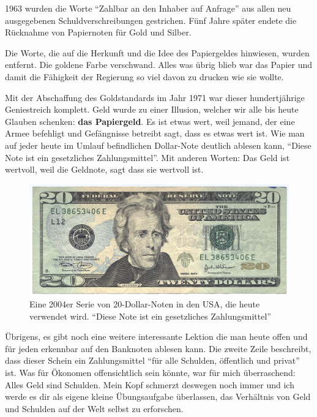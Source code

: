 1963 wurden die Worte \enquote{Zahlbar an den Inhaber auf Anfrage} aus allen neu
ausgegebenen Schuldverschreibungen gestrichen. Fünf Jahre später endete die
Rücknahme von Papiernoten für Gold und Silber.

Die Worte, die auf die Herkunft und die Idee des Papiergeldes hinwiesen, wurden
entfernt. Die goldene Farbe verschwand. Alles was übrig blieb war das Papier und
damit die Fähigkeit der Regierung so viel davon zu drucken wie sie wollte.

Mit der Abschaffung des Goldstandards im Jahr 1971 war dieser hundertjährige
Geniestreich komplett. Geld wurde zu einer Illusion, welcher wir alle bis heute
Glauben schenken: \textbf{das Papiergeld}. Es ist etwas wert, weil jemand, der
eine Armee befehligt und Gefängnisse betreibt sagt, dass es etwas wert ist. Wie
man auf jeder heute im Umlauf befindlichen Dollar-Note deutlich ablesen kann,
\enquote{Diese Note ist ein gesetzliches Zahlungsmittel}. Mit anderen Worten:
Das Geld ist wertvoll, weil die Geldnote, sagt dass sie wertvoll ist.

\begin{figure}
  \centering
  \includegraphics{assets/images/us-dollar-2004.jpg}
  \caption{Eine 2004er Serie von 20-Dollar-Noten in den USA, die heute verwendet
  wird. \enquote{Diese Note ist ein gesetzliches Zahlungsmittel}}
  \label{fig:us-dollar-2004}
\end{figure}

Übrigens, es gibt noch eine weitere interessante Lektion die man heute offen und
für jeden erkennbar auf den Banknoten ablesen kann. Die zweite Zeile beschreibt,
dass dieser Schein ein Zahlungsmittel \enquote{für alle Schulden, öffentlich und
privat} ist. Was für Ökonomen offensichtlich sein könnte, war für mich
überraschend: Alles Geld sind Schulden. Mein Kopf schmerzt deswegen noch immer
und ich werde es dir als eigene kleine Übungsaufgabe überlassen, das Verhältnis
von Geld und Schulden auf der Welt selbst zu erforschen.

